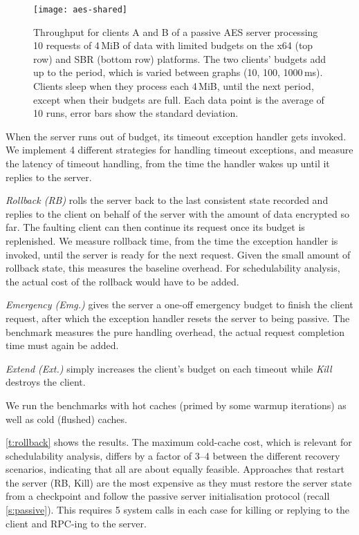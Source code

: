 \begin{figure*}[t]
  \centering
  \texttt{[image: aes-shared]}
  \caption{Throughput for clients A and B of a passive AES server processing 10 requests of 4\,MiB of data with
      limited budgets on the x64 (top row) and SBR (bottom row) platforms. The two clients' budgets
      add up to the period, which is varied between graphs (10, 100, 1000\,ms). Clients sleep when
      they process each 4\,MiB, until the next period, except when their budgets are full. Each data point is the average of 10 runs, error bars show the standard deviation.}
  \label{f:aes}
\end{figure*}

When the server runs out of budget, its timeout exception handler gets
invoked. We implement 4 different strategies for handling timeout exceptions,
and measure the latency of timeout handling, from the time the handler wakes up
until it replies to the server.

\emph{Rollback (RB)} rolls the server back to the last consistent state
recorded and replies to the client on behalf of the server with the amount of data
encrypted so far. The faulting client can then continue its request once its budget is replenished.
We measure rollback time, from the time the exception handler is
invoked, until the server is ready for the next request. Given the
small amount of rollback state, this measures the baseline
    overhead. For schedulability analysis, the actual cost of the rollback would
have to be added.

\emph{Emergency (Emg.)} gives the server a one-off emergency budget to finish
the client request, after which the exception handler
resets the server to being passive. The benchmark measures the
pure handling overhead, the actual request completion time must again be added.

\emph{Extend (Ext.)} simply increases the client's budget on each timeout while \emph{Kill} destroys the client.

We run the benchmarks with hot caches (primed by some warmup
iterations)  as well as cold (flushed) caches.

\autoref{t:rollback} shows the results. The maximum
cold-cache cost, which is relevant for schedulability analysis,
differs by a factor of 3--4 between the different recovery scenarios,
indicating that all are about equally feasible.
Approaches that restart the server (RB, Kill) are the most expensive
as they must restore the server state from a
checkpoint and follow the passive server initialisation protocol
(recall \autoref{s:passive}). This requires
5 system calls in each case for killing or replying to the client and RPC-ing to the server.

